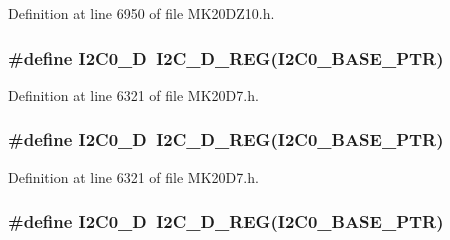 Definition at line 6950 of file M\+K20\+D\+Z10.\+h.

\subsubsection[{\texorpdfstring{I2\+C0\+\_\+D}{I2C0_D}}]{\setlength{\rightskip}{0pt plus 5cm}\#define I2\+C0\+\_\+D~{\bf I2\+C\+\_\+\+D\+\_\+\+R\+EG}({\bf I2\+C0\+\_\+\+B\+A\+S\+E\+\_\+\+P\+TR})}\hypertarget{group___i2_c___register___accessor___macros_ga1f0514321da14a62a0352b297e6614b7}{}\label{group___i2_c___register___accessor___macros_ga1f0514321da14a62a0352b297e6614b7}


Definition at line 6321 of file M\+K20\+D7.\+h.

\subsubsection[{\texorpdfstring{I2\+C0\+\_\+D}{I2C0_D}}]{\setlength{\rightskip}{0pt plus 5cm}\#define I2\+C0\+\_\+D~{\bf I2\+C\+\_\+\+D\+\_\+\+R\+EG}({\bf I2\+C0\+\_\+\+B\+A\+S\+E\+\_\+\+P\+TR})}\hypertarget{group___i2_c___register___accessor___macros_ga1f0514321da14a62a0352b297e6614b7}{}\label{group___i2_c___register___accessor___macros_ga1f0514321da14a62a0352b297e6614b7}


Definition at line 6321 of file M\+K20\+D7.\+h.

\subsubsection[{\texorpdfstring{I2\+C0\+\_\+D}{I2C0_D}}]{\setlength{\rightskip}{0pt plus 5cm}\#define I2\+C0\+\_\+D~{\bf I2\+C\+\_\+\+D\+\_\+\+R\+EG}({\bf I2\+C0\+\_\+\+B\+A\+S\+E\+\_\+\+P\+TR})}\hypertarget{group___i2_c___register___accessor___macros_ga1f0514321da14a62a0352b297e6614b7}{}\label{group___i2_c___register___accessor___macros_ga1f0514321da14a62a0352b297e6614b7}


